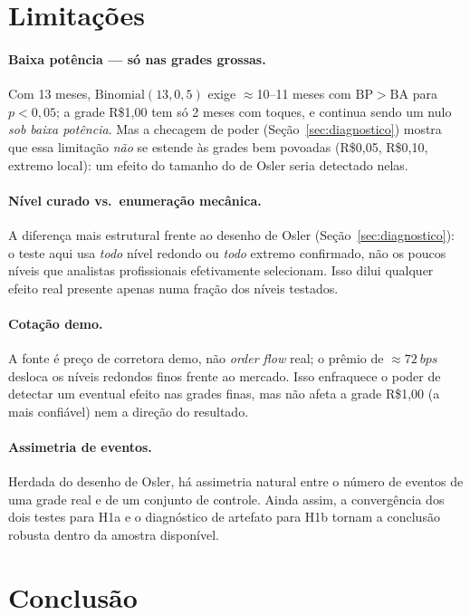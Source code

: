 \documentclass[11pt,a4paper]{article}
\begin{document}
\section{Limitações}

\paragraph{Baixa potência --- só nas grades grossas.} Com \num{13} meses,
$\mathrm{Binomial}(13, 0{,}5)$ exige $\approx$10--11 meses com $\mathrm{BP}>\mathrm{BA}$ para
$p<0{,}05$; a grade R\$1,00 tem só 2 meses com toques, e continua sendo um nulo \emph{sob
baixa potência}. Mas a checagem de poder (Seção~\ref{sec:diagnostico}) mostra que essa
limitação \emph{não} se estende às grades bem povoadas (R\$0,05, R\$0,10, extremo local): um
efeito do tamanho do de Osler seria detectado nelas.

\paragraph{Nível curado vs.\ enumeração mecânica.} A diferença mais estrutural frente ao
desenho de Osler (Seção~\ref{sec:diagnostico}): o teste aqui usa \emph{todo} nível redondo ou
\emph{todo} extremo confirmado, não os poucos níveis que analistas profissionais efetivamente
selecionam. Isso dilui qualquer efeito real presente apenas numa fração dos níveis testados.

\paragraph{Cotação demo.} A fonte é preço de corretora demo, não \emph{order flow} real; o
prêmio de $\approx\SI{72}{bps}$ desloca os níveis redondos finos frente ao mercado. Isso
enfraquece o poder de detectar um eventual efeito nas grades finas, mas não afeta a grade
R\$1,00 (a mais confiável) nem a direção do resultado.

\paragraph{Assimetria de eventos.} Herdada do desenho de Osler, há assimetria natural entre o
número de eventos de uma grade real e de um conjunto de controle. Ainda assim, a convergência
dos dois testes para H1a e o diagnóstico de artefato para H1b tornam a conclusão robusta
dentro da amostra disponível.

\section{Conclusão}
\end{document}
